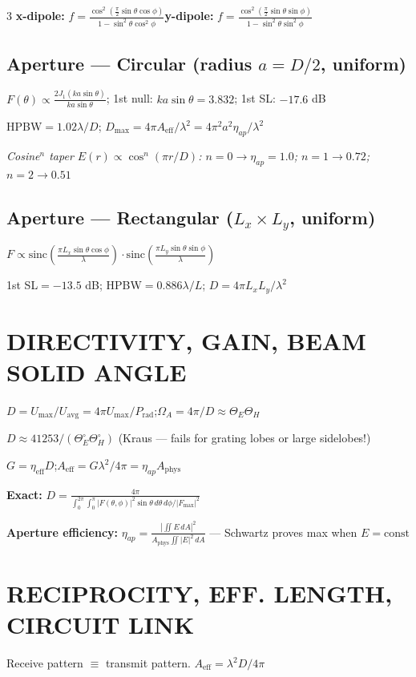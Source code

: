 \documentclass[6pt,landscape]{article}
\begin{document}
\begin{multicols}{3}
\textbf{x-dipole:} $f=\frac{\cos^2(\frac{\pi}{2}\sin\theta\cos\phi)}{1-\sin^2\theta\cos^2\phi}$\quad\textbf{y-dipole:} $f=\frac{\cos^2(\frac{\pi}{2}\sin\theta\sin\phi)}{1-\sin^2\theta\sin^2\phi}$

\subsection*{Aperture — Circular (radius $a=D/2$, uniform)}
$F(\theta)\propto\frac{2J_1(ka\sin\theta)}{ka\sin\theta}$; 1st null: $ka\sin\theta=3.832$; 1st SL: $-17.6$ dB

HPBW$=1.02\lambda/D$; $D_\text{max}=4\pi A_\text{eff}/\lambda^2=4\pi^2 a^2\eta_{ap}/\lambda^2$

\textit{Cosine$^n$ taper $E(r)\propto\cos^n(\pi r/D)$: $n=0\to\eta_{ap}=1.0$; $n=1\to0.72$; $n=2\to0.51$}

\subsection*{Aperture — Rectangular ($L_x\times L_y$, uniform)}
$F\propto\text{sinc}\!\left(\frac{\pi L_x\sin\theta\cos\phi}{\lambda}\right)\!\cdot\!\text{sinc}\!\left(\frac{\pi L_y\sin\theta\sin\phi}{\lambda}\right)$

1st SL$=-13.5$ dB; HPBW$=0.886\lambda/L$; $D=4\pi L_x L_y/\lambda^2$

\section*{DIRECTIVITY, GAIN, BEAM SOLID ANGLE}
$D=U_\text{max}/U_\text{avg}=4\pi U_\text{max}/P_\text{rad}$;\quad $\Omega_A=4\pi/D\approx\Theta_E\Theta_H$

$D\approx41253/(\Theta_E^\circ\Theta_H^\circ)$ (Kraus — fails for grating lobes or large sidelobes!)

$G=\eta_\text{eff}D$;\quad $A_\text{eff}=G\lambda^2/4\pi=\eta_{ap}A_\text{phys}$

\textbf{Exact:} $D=\frac{4\pi}{{\int_0^{2\pi}\!\int_0^\pi |F(\theta,\phi)|^2\sin\theta\,d\theta\,d\phi}/{|F_\text{max}|^2}}$

\textbf{Aperture efficiency:} $\eta_{ap}=\frac{|\iint E\,dA|^2}{A_\text{phys}\iint|E|^2\,dA}$ — Schwartz proves max when $E=\text{const}$

\section*{RECIPROCITY, EFF. LENGTH, CIRCUIT LINK}
Receive pattern $\equiv$ transmit pattern. $A_\text{eff}=\lambda^2 D/4\pi$


\end{multicols}
\end{document}
